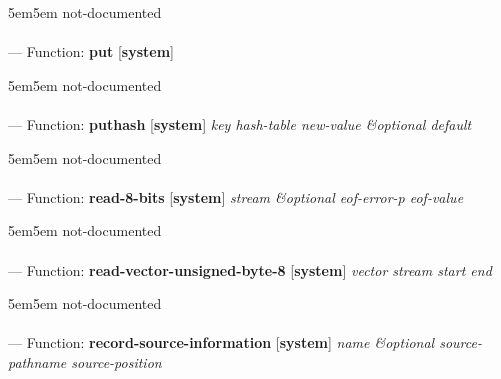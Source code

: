 \begin{adjustwidth}{5em}{5em}
not-documented
\end{adjustwidth}

\paragraph{}
\label{SYSTEM:PUT}
--- Function: \textbf{put} [\textbf{system}] \textit{}

\begin{adjustwidth}{5em}{5em}
not-documented
\end{adjustwidth}

\paragraph{}
\label{SYSTEM:PUTHASH}
--- Function: \textbf{puthash} [\textbf{system}] \textit{key hash-table new-value \&optional default}

\begin{adjustwidth}{5em}{5em}
not-documented
\end{adjustwidth}

\paragraph{}
\label{SYSTEM:READ-8-BITS}
--- Function: \textbf{read-8-bits} [\textbf{system}] \textit{stream \&optional eof-error-p eof-value}

\begin{adjustwidth}{5em}{5em}
not-documented
\end{adjustwidth}

\paragraph{}
\label{SYSTEM:READ-VECTOR-UNSIGNED-BYTE-8}
--- Function: \textbf{read-vector-unsigned-byte-8} [\textbf{system}] \textit{vector stream start end}

\begin{adjustwidth}{5em}{5em}
not-documented
\end{adjustwidth}

\paragraph{}
\label{SYSTEM:RECORD-SOURCE-INFORMATION}
--- Function: \textbf{record-source-information} [\textbf{system}] \textit{name \&optional source-pathname source-position}

